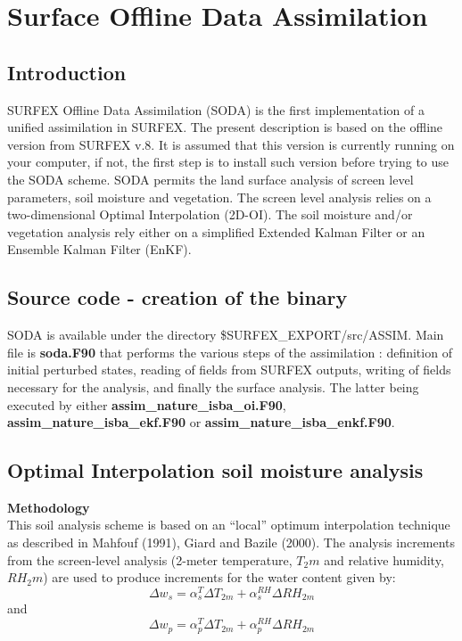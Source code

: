 
\chapter{Surface Offline Data Assimilation}
\minitoc


\section{Introduction}
SURFEX Offline Data Assimilation (SODA) is the first implementation of a unified assimilation in SURFEX. The present description is based on the offline version from SURFEX v.8. It is assumed that this version is currently running on your computer, if not, the first step is to install such version before trying to use the SODA scheme. SODA permits the land surface analysis of screen level parameters, soil moisture and vegetation. The screen level analysis relies on a two-dimensional Optimal Interpolation (2D-OI). The soil moisture and/or vegetation analysis rely either on a simplified Extended Kalman Filter or an Ensemble Kalman Filter (EnKF).

\section{Source code - creation of the binary}
SODA is available under the directory \$SURFEX\_EXPORT/src/ASSIM. Main file is {\bf soda.F90} that performs the various steps of the assimilation : definition of initial perturbed states, reading of fields from SURFEX outputs, writing of fields necessary for the analysis, and finally the surface analysis. The latter being executed by either {\bf assim\_nature\_isba\_oi.F90}, {\bf assim\_nature\_isba\_ekf.F90} or {\bf assim\_nature\_isba\_enkf.F90}.

\section{Optimal Interpolation soil moisture analysis}
{\large {\bf Methodology}} \\
This soil analysis scheme is based on an “local” optimum interpolation technique as described in Mahfouf (1991)\nocite{mahfouf_1991}, Giard and Bazile (2000)\nocite{giard_bazile_00}. The analysis increments from the screen-level analysis (2-meter temperature, $T_2m$ and relative humidity, $RH_2m$) are used to produce increments for the water content given by: \\
\begin{equation}
\Delta w_{s} = \alpha_s^T  \Delta T_{2m} + \alpha_s^{RH} \Delta RH_{2m}
\end{equation}
and
\begin{equation}
\Delta w_{p} = \alpha_p^T  \Delta T_{2m} + \alpha_p^{RH} \Delta RH_{2m}
\end{equation}

